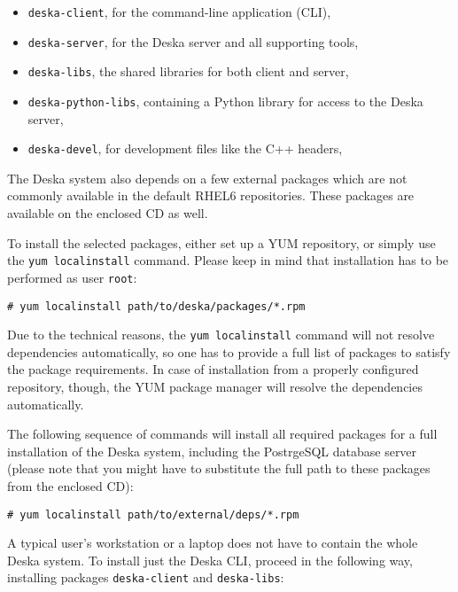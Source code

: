 \documentclass[deska]{subfiles}
\begin{document}
\begin{itemize}
    \item {\tt deska-client}, for the command-line application (CLI),
    \item {\tt deska-server}, for the Deska server and all supporting tools,
    \item {\tt deska-libs}, the shared libraries for both client and server,
    \item {\tt deska-python-libs}, containing a Python library for access to the Deska server,
    \item {\tt deska-devel}, for development files like the C++ headers,
\end{itemize}

The Deska system also depends on a few external packages which are not commonly available in the default RHEL6
repositories.  These packages are available on the enclosed CD as well.

To install the selected packages, either set up a YUM repository, or simply use the {\tt yum localinstall} command.
Please keep in mind that installation has to be performed as user {\tt root}:

\begin{verbatim}
# yum localinstall path/to/deska/packages/*.rpm
\end{verbatim}

Due to the technical reasons, the {\tt yum localinstall} command will not resolve dependencies automatically, so one has
to provide a full list of packages to satisfy the package requirements.  In case of installation from a properly
configured repository, though, the YUM package manager will resolve the dependencies automatically.

The following sequence of commands will install all required packages for a full installation of the Deska system,
including the PostrgeSQL database server (please note that you might have to substitute the full path to these packages
from the enclosed CD):


\begin{verbatim}
# yum localinstall path/to/external/deps/*.rpm
\end{verbatim}

A typical user's workstation or a laptop does not have to contain the whole Deska system.  To install just the Deska
CLI, proceed in the following way, installing packages {\tt deska-client} and {\tt deska-libs}:
\end{document}

